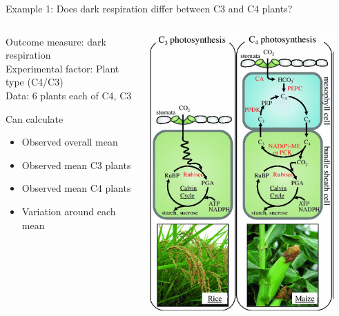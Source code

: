 \documentclass[10pt]{beamer}
\begin{document}
\begin{frame}{Example 1: Does dark respiration differ between C3 and C4 plants?}

\begin{columns}
 \begin{column}{0.6\textwidth}
  Outcome measure: dark respiration\\
  Experimental factor: Plant type (C4/C3)\\
  Data: 6 plants each of C4, C3

  \begin{block}{Can calculate}
 \begin{itemize}
  \item Observed overall mean
  \item Observed mean C3 plants
  \item Observed mean C4 plants
  \item Variation around each mean
 \end{itemize}
\end{block}
  \end{column}
  \begin{column}{0.4\textwidth}
   \includegraphics[width=0.9\textwidth]{Figures/c34}
  \end{column}

\end{columns}


\end{frame}
\end{document}
